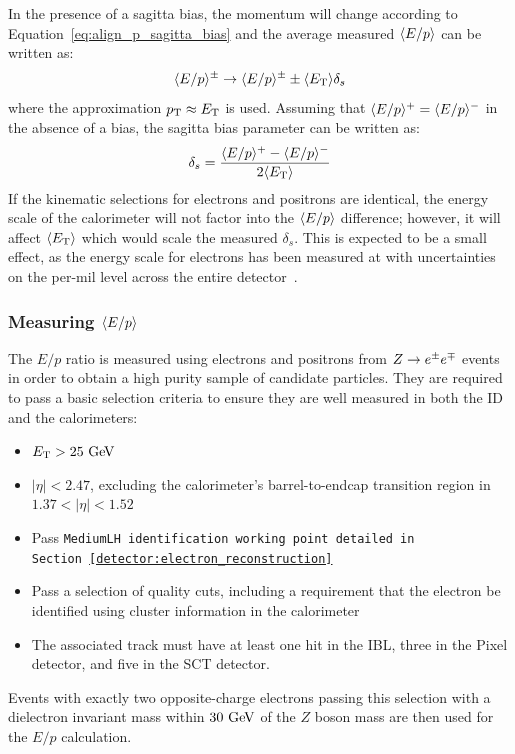 In the presence of a sagitta bias, the momentum will change according to Equation~\ref{eq:align_p_sagitta_bias} and the average measured $\langle E/p\rangle$ can be written as:
\begin{equation}
  \langle E/p\rangle^{\pm}\rightarrow\langle E/p\rangle^{\pm}\pm\langle E_{\mathrm{T}}\rangle\delta_s
\end{equation}
where the approximation $p_{\mathrm{T}}\approx E_{\mathrm{T}}$ is used.
Assuming that $\langle E/p\rangle^+ = \langle E/p\rangle^-$ in the absence of a bias, the sagitta bias parameter can be written as:
\begin{equation}
  \delta_s = \frac{\eop^+ - \eop^-}{2\langle\et\rangle}
\label{eq:align_eop_sagitta}
\end{equation}
If the kinematic selections for electrons and positrons are identical, the energy scale of the calorimeter will not factor into the $\langle E/p\rangle$ difference; however, it will affect $\langle E_{\mathrm{T}}\rangle$ which would scale the measured $\delta_s$.
This is expected to be a small effect, as the energy scale for electrons has been measured at  with uncertainties on the per-mil level across the entire detector~\cite{2016.electron-photon-calibration}.

\subsubsection{Measuring $\langle E/p\rangle$}
The $E/p$ ratio is measured using electrons and positrons from $Z\rightarrow e^{\pm}e^{\mp}$ events in order to obtain a high purity sample of candidate particles.
They are required to pass a basic selection criteria to ensure they are well measured in both the ID and the calorimeters:
\begin{itemize}
  \item $\et > 25\gev$
  \item $|\eta| < 2.47$, excluding the calorimeter's barrel-to-endcap transition region in $1.37<|\eta|<1.52$
  \item Pass \tt{MediumLH} identification working point detailed in Section~\ref{detector:electron_reconstruction}
  \item Pass a selection of quality cuts, including a requirement that the electron be identified using cluster information in the calorimeter %
  \item The associated track must have at least one hit in the IBL, three in the Pixel detector, and five in the SCT detector.
\end{itemize}
Events with exactly two opposite-charge electrons passing this selection with a dielectron invariant mass within $30\gev$ of the $Z$ boson mass are then used for the $E/p$ calculation.

